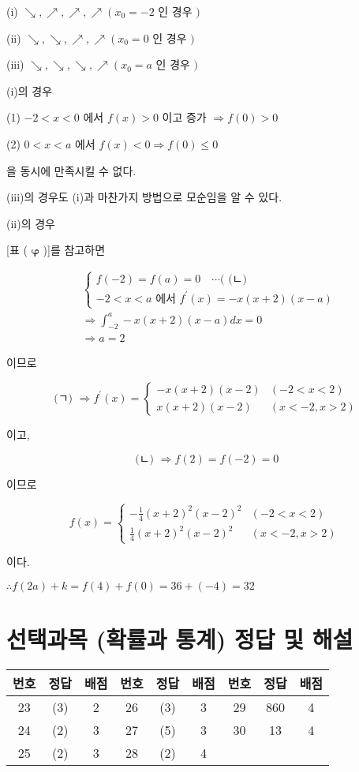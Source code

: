 \documentclass[10pt]{article}
\begin{document}
(i) \(\searrow, \nearrow, \nearrow, \nearrow\left(x_{0}=-2\right.\) 인 경우 \()\)

(ii) \(\searrow, \searrow, \nearrow, \nearrow\left(x_{0}=0\right.\) 인 경우 \()\)

(iii) \(\searrow, \searrow, \searrow, \nearrow\left(x_{0}=a\right.\) 인 경우 \()\)

(i)의 경우

(1) \(-2<x<0\) 에서 \(f(x)>0\) 이고 증가 \(\Rightarrow f(0)>0\)

(2) \(0<x<a\) 에서 \(f(x)<0 \Rightarrow f(0) \leq 0\)

을 동시에 만족시킬 수 없다.

(iii)의 경우도 (i)과 마찬가지 방법으로 모순임을 알 수 있다.

(ii)의 경우

[표 ( \(\boldsymbol{\varphi}\) )]를 참고하면

\[
\begin{aligned}
& \left\{\begin{array}{l}
f(-2)=f(a)=0 \quad \cdots(\text { (ㄴ) } \\
-2<x<a \text { 에서 } f^{\prime}(x)=-x(x+2)(x-a)
\end{array}\right. \\
& \Rightarrow \int_{-2}^{a}-x(x+2)(x-a) d x=0 \\
& \Rightarrow a=2
\end{aligned}
\]

이므로

\[
\text { (ㄱ) } \Rightarrow f^{\prime}(x)= \begin{cases}-x(x+2)(x-2) & (-2<x<2) \\ x(x+2)(x-2) & (x<-2, x>2)\end{cases}
\]

이고,

\[
\text { (ㄴ) } \Rightarrow f(2)=f(-2)=0
\]

이므로

\[
f(x)= \begin{cases}-\frac{1}{4}(x+2)^{2}(x-2)^{2} & (-2<x<2) \\ \frac{1}{4}(x+2)^{2}(x-2)^{2} & (x<-2, x>2)\end{cases}
\]

이다.

\(\therefore f(2 a)+k=f(4)+f(0)=36+(-4)=32\)

\section*{선택과목 (확률과 통계) 정답 및 해설}
\begin{center}
\begin{tabular}{|c|c|c|c|c|c|c|c|c|}
\hline
번호 & 정답 & 배점 & 번호 & 정답 & 배점 & 번호 & 정답 & 배점 \\
\hline
23 & (3) & 2 & 26 & (3) & 3 & 29 & 860 & 4 \\
\hline
24 & (2) & 3 & 27 & (5) & 3 & 30 & 13 & 4 \\
\hline
25 & (2) & 3 & 28 & (2) & 4 &  &  &  \\
\hline
\end{tabular}
\end{center}
\end{document}
